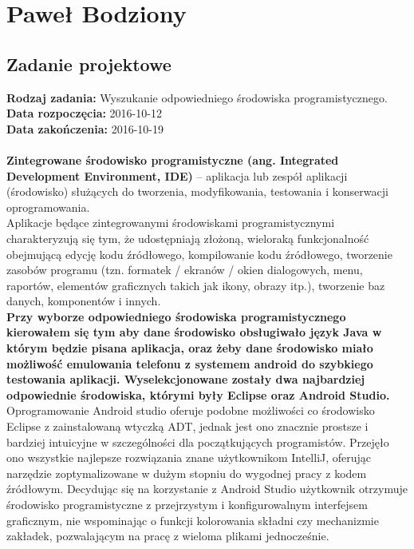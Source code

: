 \chapter {Paweł Bodziony}
\section{Zadanie projektowe}
\noindent\textbf{Rodzaj zadania:} Wyszukanie odpowiedniego środowiska programistycznego. \\

\noindent\textbf{Data rozpoczęcia:} 2016-10-12\\

\noindent\textbf{Data zakończenia:} 2016-10-19\\
\\

\textbf{Zintegrowane środowisko programistyczne (ang. Integrated Development Environment, IDE)} – aplikacja lub zespół aplikacji (środowisko) służących do tworzenia, modyfikowania, testowania i konserwacji oprogramowania.
\\

Aplikacje będące zintegrowanymi środowiskami programistycznymi charakteryzują się tym, że udostępniają złożoną, wieloraką funkcjonalność obejmującą edycję kodu źródłowego, kompilowanie kodu źródłowego, tworzenie zasobów programu (tzn. formatek / ekranów / okien dialogowych, menu, raportów, elementów graficznych takich jak ikony, obrazy itp.), tworzenie baz danych, komponentów i innych.
\\

\textbf{Przy wyborze odpowiedniego środowiska programistycznego kierowałem się tym aby dane środowisko obsługiwało język Java w którym będzie pisana aplikacja, oraz żeby dane środowisko miało możliwość emulowania telefonu z systemem android do szybkiego testowania aplikacji. Wyselekcjonowane zostały dwa  najbardziej odpowiednie środowiska, którymi były Eclipse oraz Android Studio.}
\\

Oprogramowanie Android studio oferuje podobne możliwości co środowisko Eclipse z zainstalowaną wtyczką ADT, jednak jest ono znacznie prostsze i bardziej intuicyjne w szczególności dla początkujących programistów. Przejęło ono wszystkie najlepsze rozwiązania znane użytkownikom IntelliJ, oferując narzędzie zoptymalizowane w dużym stopniu do wygodnej pracy z kodem źródłowym. Decydując się na korzystanie z Android Studio użytkownik otrzymuje środowisko programistyczne z przejrzystym i konfigurowalnym interfejsem graficznym, nie wspominając o funkcji kolorowania składni czy mechanizmie zakładek, pozwalającym na pracę z wieloma plikami jednocześnie.


